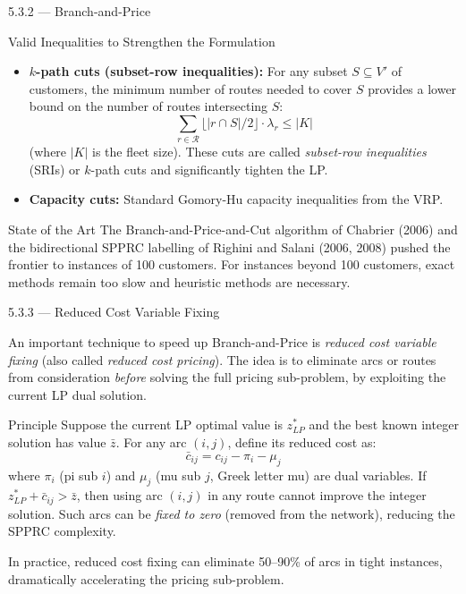 \documentclass[aspectratio=169,10pt]{beamer}
\begin{document}
\begin{frame}[allowframebreaks]{5.3.2 --- Branch-and-Price}
\begin{block}{Valid Inequalities to Strengthen the Formulation}
\begin{itemize}
  \item \textbf{$k$-path cuts (subset-row inequalities):} For any subset
    $S \subseteq V'$ of customers, the minimum number of routes needed to cover
    $S$ provides a lower bound on the number of routes intersecting $S$:
    \[
      \sum_{r \in \mathcal{R}} \lfloor |r \cap S| / 2 \rfloor \cdot \lambda_r
      \leq |K|
    \]
    (where $|K|$ is the fleet size).  These cuts are called \emph{subset-row
    inequalities} (SRIs) or $k$-path cuts and significantly tighten the LP.

  \item \textbf{Capacity cuts:} Standard Gomory-Hu capacity inequalities from
    the VRP.
\end{itemize}
\end{block}

\begin{alertblock}{State of the Art}
The Branch-and-Price-and-Cut algorithm of Chabrier (2006) and the bidirectional
SPPRC labelling of Righini and Salani (2006, 2008) pushed the frontier to instances
of 100 customers.  For instances beyond 100 customers, exact methods remain too slow
and heuristic methods are necessary.
\end{alertblock}

\end{frame}

\begin{frame}[allowframebreaks]{5.3.3 --- Reduced Cost Variable Fixing}

An important technique to speed up Branch-and-Price is \emph{reduced cost variable
fixing} (also called \emph{reduced cost pricing}).  The idea is to eliminate arcs or
routes from consideration \emph{before} solving the full pricing sub-problem, by
exploiting the current LP dual solution.

\begin{block}{Principle}
Suppose the current LP optimal value is $z^*_{LP}$ and the best known integer
solution has value $\bar{z}$.  For any arc $(i,j)$, define its reduced cost as:
\[
  \bar{c}_{ij} = c_{ij} - \pi_i - \mu_j
\]
where $\pi_i$ (pi sub $i$) and $\mu_j$ (mu sub $j$, Greek letter mu) are dual
variables.  If $z^*_{LP} + \bar{c}_{ij} > \bar{z}$, then using arc $(i,j)$ in any
route cannot improve the integer solution.  Such arcs can be \emph{fixed to zero}
(removed from the network), reducing the SPPRC complexity.

\medskip
In practice, reduced cost fixing can eliminate 50--90\% of arcs in tight instances,
dramatically accelerating the pricing sub-problem.
\end{block}

\end{frame}
\end{document}
